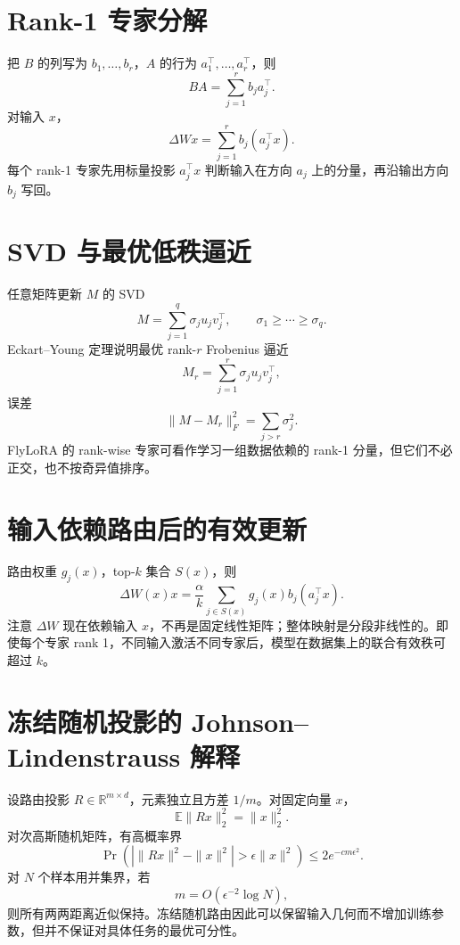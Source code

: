 \documentclass[UTF8,12pt,a4paper,fontset=none]{ctexart}
\numberwithin{equation}{section}
\newcommand{\R}{\mathbb{R}}
\newcommand{\E}{\mathbb{E}}
\begin{document}
\section{Rank-1 专家分解}
把 $B$ 的列写为 $b_1,\ldots,b_r$，$A$ 的行为 $a_1^\top,\ldots,a_r^\top$，则
\begin{equation}
 BA=\sum_{j=1}^{r}b_ja_j^\top.
\end{equation}
对输入 $x$，
\begin{equation}
 \Delta Wx=\sum_{j=1}^{r}b_j(a_j^\top x).
\end{equation}
每个 rank-1 专家先用标量投影 $a_j^\top x$ 判断输入在方向 $a_j$ 上的分量，再沿输出方向 $b_j$ 写回。

\section{SVD 与最优低秩逼近}
任意矩阵更新 $M$ 的 SVD
\begin{equation}
 M=\sum_{j=1}^{q}\sigma_ju_jv_j^\top,
 \qquad \sigma_1\ge\cdots\ge\sigma_q.
\end{equation}
Eckart--Young 定理说明最优 rank-$r$ Frobenius 逼近
\begin{equation}
 M_r=\sum_{j=1}^{r}\sigma_ju_jv_j^\top,
\end{equation}
误差
\begin{equation}
 \|M-M_r\|_F^2=\sum_{j>r}\sigma_j^2.
\end{equation}
FlyLoRA 的 rank-wise 专家可看作学习一组数据依赖的 rank-1 分量，但它们不必正交，也不按奇异值排序。

\section{输入依赖路由后的有效更新}
路由权重 $g_j(x)$，top-$k$ 集合 $S(x)$，则
\begin{equation}
 \Delta W(x)x=\frac{\alpha}{k}
 \sum_{j\in S(x)}g_j(x)b_j(a_j^\top x).
\end{equation}
注意 $\Delta W$ 现在依赖输入 $x$，不再是固定线性矩阵；整体映射是分段非线性的。即使每个专家 rank 1，不同输入激活不同专家后，模型在数据集上的联合有效秩可超过 $k$。

\section{冻结随机投影的 Johnson--Lindenstrauss 解释}
设路由投影 $R\in\R^{m\times d}$，元素独立且方差 $1/m$。对固定向量 $x$，
\begin{equation}
 \E\|Rx\|_2^2=\|x\|_2^2.
\end{equation}
对次高斯随机矩阵，有高概率界
\begin{equation}
 \Pr\left(
 |\|Rx\|^2-\|x\|^2|>\epsilon\|x\|^2
 \right)
 \le2e^{-c m\epsilon^2}.
\end{equation}
对 $N$ 个样本用并集界，若
\begin{equation}
 m=O(\epsilon^{-2}\log N),
\end{equation}
则所有两两距离近似保持。冻结随机路由因此可以保留输入几何而不增加训练参数，但并不保证对具体任务的最优可分性。
\end{document}
